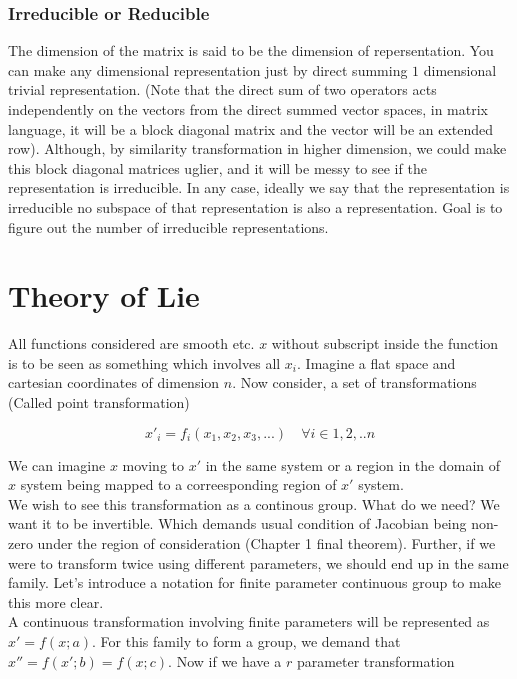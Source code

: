 \documentclass{report}
\begin{document}
\subsection{Irreducible or Reducible}

The dimension of the matrix is said to be the dimension of repersentation. You can make any dimensional representation just by direct summing $1$ dimensional trivial representation. (Note that the direct sum of two operators acts independently on the vectors from the direct summed vector spaces, in matrix language, it will be a block diagonal matrix and the vector will be an extended row). Although, by similarity transformation in higher dimension, we could make this block diagonal matrices uglier, and it will be messy to see if the representation is irreducible. In any case, ideally we say that the representation is irreducible no subspace of that representation is also a representation. Goal is to figure out the number of irreducible representations.

\chapter{Theory of Lie}

All functions considered are smooth etc. $x$ without subscript inside the function is to be seen as something which involves all $x_i$. Imagine a flat space and cartesian coordinates of dimension $n$. Now consider, a set of transformations (Called point transformation)

$$x'_i = f_i(x_1, x_2, x_3, ...) \quad \forall i \in {1,2,..n}$$

\noindent We can imagine $x$ moving to $x'$ in the same system or a region in the domain of $x$ system being mapped to a correesponding region of $x'$ system.\\

\noindent We wish to see this transformation as a continous group. What do we need? We want it to be invertible. Which demands usual condition of Jacobian being non-zero under the region of consideration (Chapter 1 final theorem). Further, if we were to transform twice using different parameters, we should end up in the same family. Let's introduce a notation for finite parameter continuous group to make this more clear. \\

\noindent A continuous transformation involving finite parameters will be represented as $x' = f(x;a)$. For this family to form a group, we demand that $x'' = f(x'; b) = f(x;c)$. Now if we have a $r$ parameter transformation 
\end{document}
